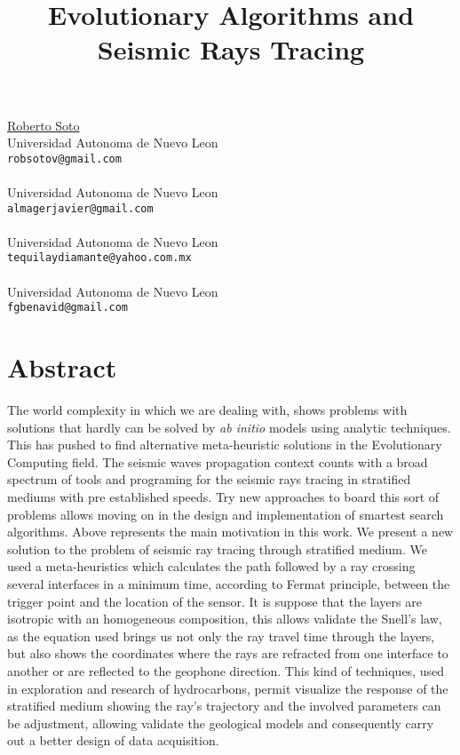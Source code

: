 \title{Evolutionary Algorithms and Seismic Rays Tracing}
\author{}  \institute{}
\maketitle
\begin{center}
{\large \underline{Roberto Soto}}\\
Universidad Autonoma de Nuevo Leon\\
{\tt robsotov@gmail.com}
\\ \vspace{4mm}{\large Javier Almaguer}\\
Universidad Autonoma de Nuevo Leon\\
{\tt almagerjavier@gmail.com}
\\ \vspace{4mm}{\large Javier Morales}\\
Universidad Autonoma de Nuevo Leon\\
{\tt tequilaydiamante@yahoo.com.mx}
\\ \vspace{4mm}{\large Francisco Benavides}\\
Universidad Autonoma de Nuevo Leon\\
{\tt fgbenavid@gmail.com}

\end{center}

\section*{Abstract}

The world complexity in which we are dealing with, shows problems with solutions that hardly can be solved by \emph{ab initio} models using analytic techniques. This has pushed to find alternative meta-heuristic solutions in the Evolutionary Computing field.
The seismic waves propagation context counts with a broad spectrum of tools and programing for the seismic rays tracing in stratified mediums with pre established speeds.
Try new approaches to board this sort of problems allows moving on in the design and implementation of smartest search algorithms. 
Above represents the main motivation in this work.  We present a new solution to the problem of seismic ray tracing through stratified medium. 
We used a meta-heuristics which calculates the path followed by a ray crossing several interfaces in a minimum time, according to Fermat principle, between the trigger point and the location of the sensor. 
It is suppose that the layers are isotropic with an homogeneous composition, this allows validate the Snell's law, as the equation used brings us not only the ray travel time through the layers, but also shows the coordinates where the rays are refracted from one interface to another or are reflected to the geophone direction. 
This kind of techniques, used in exploration and research of hydrocarbons, permit visualize the response of the stratified medium showing the ray's trajectory and the involved parameters can be adjustment, allowing validate the geological models and consequently carry out a better design of data acquisition. 

